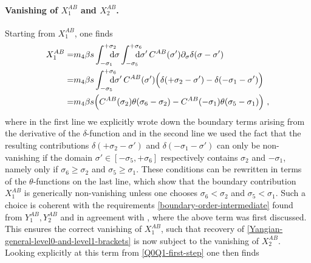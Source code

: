 \documentclass[12pt]{article}
\numberwithin{equation}{section}
\begin{document}
\paragraph{Vanishing of $X_{1}^{AB}$ and $X_{2}^{AB}$.}
Starting from $X_{1}^{AB}$, one finds
\begin{equation}\label{vanishing-X1AB}
\begin{aligned}
X_{1}^{AB}=&m_{4}\beta s \int_{-\sigma_{1}}^{+\sigma_{2}}\!\!\!\!\!\!\mathrm{d}\sigma
\int_{-\sigma_{5}}^{+\sigma_{6}}\!\!\!\!\!\!\mathrm{d}\sigma' \,C^{AB}(\sigma')\partial_{\sigma}\delta(\sigma-\sigma') 
\\
=&m_{4}\beta s \int_{-\sigma_{5}}^{+\sigma_{6}}\!\!\!\!\!\!\mathrm{d}\sigma' \,C^{AB}(\sigma') \Bigl( \delta(+\sigma_{2}-\sigma')-\delta(-\sigma_{1}-\sigma') \Bigr)
\\
=&m_{4}\beta s \Bigl( C^{AB}(\sigma_{2})\theta(\sigma_{6}-\sigma_{2})-C^{AB}(-\sigma_{1})\theta(\sigma_{5}-\sigma_{1}) \Bigr) \,\, ,
\end{aligned}
\end{equation}
where in the first line we explicitly wrote down the boundary terms arising from the derivative of the $\delta$-function and in the second line we used the fact that the resulting contributions $\delta(+\sigma_{2}-\sigma')$ and $\delta(-\sigma_{1}-\sigma')$ can only be non-vanishing if the domain $\sigma' \in [-\sigma_{5},+\sigma_{6}]$ respectively contains $\sigma_{2}$ and $-\sigma_{1}$, namely only if $\sigma_{6}\geq \sigma_{2}$ and $\sigma_{5}\geq \sigma_{1}$. These conditions can be rewritten in terms of the $\theta$-functions on the last line, which show that the boundary contribution $X_{1}^{AB}$ is generically non-vanishing unless one chooses $\sigma_{6}<\sigma_{2}$ and $\sigma_{5}<\sigma_{1}$. Such a choice is coherent with the requirements \eqref{boundary-order-intermediate} found from $Y_{1}^{AB},Y_{2}^{AB}$ and in agreement with \cite{Klose:2016qfv}, where the above term was first discussed. This ensures the correct vanishing of $X_{1}^{AB}$, such that recovery of \eqref{Yangian-general-level0-and-level1-brackets} is now subject to the vanishing of $X_{2}^{AB}$. Looking explicitly at this term from \eqref{Q0Q1-first-step} one then finds
\end{document}
